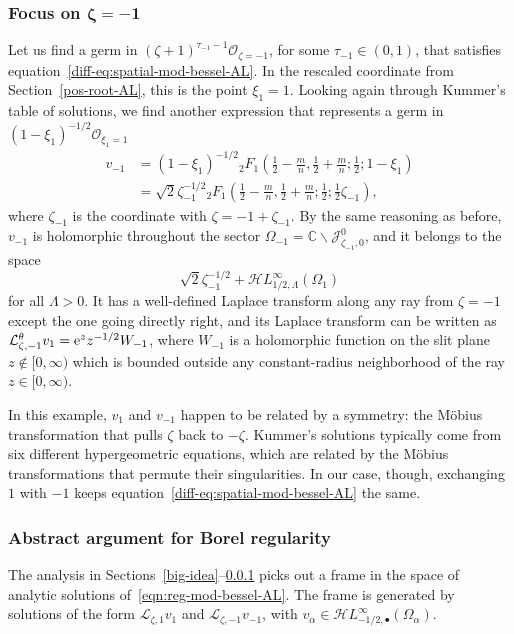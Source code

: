 \documentclass[pdftex]{sigma}
\newcommand{\singexp}[2]{\mathcal{H}L^\infty_{#1, #2}}
\newcommand{\singexpalg}[1]{\singexp{#1}{\bullet}}
\newcommand{\C}{\mathbb{C}}
\newcommand{\laplace}{\mathcal{L}}
\numberwithin{equation}{section}
\begin{document}
\subsubsection[Focus on zeta = -1]{Focus on $\boldsymbol{\zeta = -1}$}\label{neg-root-AL}
%
Let us find a germ in $(\zeta+1)^{\tau_{-1}-1} \mathcal{O}_{\zeta=-1}$, for some $\tau_{-1} \in (0, 1)$, that satisfies equation~\eqref{diff-eq:spatial-mod-bessel-AL}. In the rescaled coordinate from Section~\ref{pos-root-AL}, this is the point $\xi_1 = 1$. Looking again through Kummer's table of solutions, we find another expression \cite[formula~(15.10.14)]{dlmf} that represents a germ in $(1-\xi_1)^{-1/2} \mathcal{O}_{\xi_1=1}$
\begin{align*}
v_{-1}& = (1-\xi_1)^{-1/2} {}_2F_1\left(\frac{1}{2}-\frac{m}{n}, \frac{1}{2}+\frac{m}{n}; \frac{1}{2}; 1-\xi_1\right)\\
&= \sqrt{2} \zeta_{-1}^{-1/2} {}_2F_1\left(\frac{1}{2}-\frac{m}{n}, \frac{1}{2}+\frac{m}{n}; \frac{1}{2}; \frac{1}{2}\zeta_{-1}\right),
\end{align*}
where $\zeta_{-1}$ is the coordinate with $\zeta = -1 + \zeta_{-1}$. By the same reasoning as before, $v_{-1}$ is holomorphic throughout the sector $\Omega_{-1} = \C \smallsetminus \mathcal{J}^0_{\zeta_{-1}, 0}$, and it belongs to the space
\[ \sqrt{2} \zeta_{-1}^{-1/2} + \singexp{1/2}{\Lambda}(\Omega_1) \]
for all $\Lambda > 0$. It has a well-defined Laplace transform along any ray from $\zeta = -1$ except the one going directly right, and its Laplace transform can be written as
$\laplace^\theta_{\zeta, -1} v_1 ={
\rm e}^z z^{-1/2} W_{-1}$,
where $W_{-1}$ is a holomorphic function on the slit plane $z \notin [0, \infty)$ which is bounded outside any constant-radius neighborhood of the ray $z \in [0, \infty)$.

In this example, $v_1$ and $v_{-1}$ happen to be related by a symmetry: the M\"{o}bius transformation that pulls $\zeta$ back to $-\zeta$. Kummer's solutions typically come from six different hypergeometric equations, which are related by the M\"{o}bius transformations that permute their singularities. In our case, though, exchanging $1$ with $-1$ keeps equation~\eqref{diff-eq:spatial-mod-bessel-AL} the same.
\subsubsection{Abstract argument for Borel regularity}\label{bessel-regularity-AL}
The analysis in Sections~\ref{big-idea}--\ref{neg-root-AL} picks out a frame in the space of analytic solutions of~\eqref{eqn:reg-mod-bessel-AL}. The frame is generated by solutions of the form $\laplace_{\zeta, 1} v_1$ and $\laplace_{\zeta, -1} v_{-1}$, with $v_\alpha \in \singexpalg{-1/2}(\Omega_\alpha)$.
\end{document}
